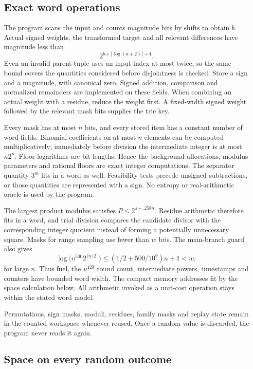 \subsection{Exact word operations}

The program scans the input and counts magnitude bits by shifts to
obtain \(b\). Actual signed weights, the transformed target and all
relevant differences have magnitude less than
\[
 2^{b+\lceil\log(n+2)\rceil+4}.
\]
Even an invalid parent tuple uses an input index at most twice, so the
same bound covers the quantities considered before disjointness is
checked. Store a sign and a magnitude, with canonical zero. Signed
addition, comparison and normalized remainders are implemented on
these fields. When combining an actual weight with a residue, reduce
the weight first. A fixed-width signed weight followed by the relevant
mask bits supplies the trie key.

Every mask has at most \(n\) bits, and every stored item has a constant
number of word fields. Binomial coefficients on at most \(n\) elements
can be computed multiplicatively; immediately before division the
intermediate integer is at most \(n2^n\). Floor logarithms are bit
lengths. Hence the background allocations, modulus parameters and
rational floors are exact integer computations. The separator quantity
\(3^m\) fits in a word as well. Feasibility tests precede unsigned
subtractions, or those quantities are represented with a sign.
No entropy or real-arithmetic oracle is used by the program.

The largest product modulus satisfies \(P\le2^{s+.258n}\). Residue
arithmetic therefore fits in a word, and trial division compares the
candidate divisor with the corresponding integer quotient instead of
forming a potentially unnecessary square. Masks for range sampling
use fewer than \(w\) bits. The main-branch guard also gives
\[
 \log\bigl(u^{500}2^{\lceil n/2\rceil}\bigr)
 \le (1/2+500/10^9)n+1<w,
\]
for large \(n\). Thus fuel, the \(u^{120}\) round count, intermediate
powers, timestamps and counters have bounded word width. The compact
memory addresses fit by the space calculation below. All arithmetic
invoked as a unit-cost operation stays within the stated word model.

Permutations, sign masks, moduli, residues, family masks and replay
state remain in the counted workspace whenever reused. Once a random
value is discarded, the program never reads it again.

\subsection{Space on every random outcome}

